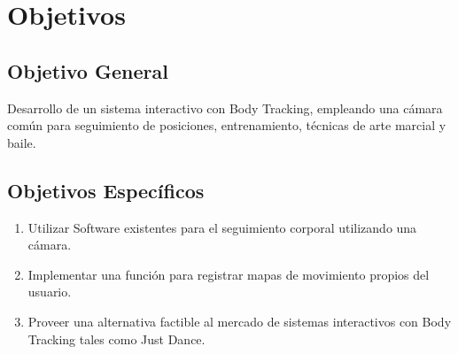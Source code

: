 \chapter{Objetivos}

\section{Objetivo General}

Desarrollo de un sistema interactivo con Body Tracking, empleando una cámara común para seguimiento de posiciones, entrenamiento, técnicas de arte marcial y baile.
\section{Objetivos Específicos}

\begin{enumerate}
	\item Utilizar Software existentes para el seguimiento corporal utilizando una cámara.
	\item Implementar una función para registrar mapas de movimiento propios del usuario.
	\item Proveer una alternativa factible al mercado de sistemas interactivos con Body Tracking tales como Just Dance.
\end{enumerate}